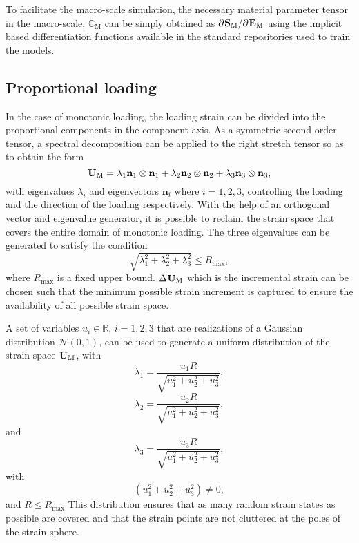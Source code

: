 To facilitate the macro-scale simulation, the necessary material parameter tensor in the macro-scale, $ \mathbb{C}_\text{M} $ can be simply obtained as $ \partial\tgm[]{S}/\partial\tgm[]{E} $ using the implicit based differentiation functions available in the standard repositories used to train the models.

\subsection{Proportional loading}\label{nn-gendata-prop}
In the case of monotonic loading, the loading strain can be divided into the proportional components in the component axis. As a symmetric second order tensor, a spectral decomposition can be applied to the right stretch tensor so as to obtain the form
\begin{equation}\label{eq-nn-gen2}
\tgm[]{U}=\lambda_1\textbf{n}_1\otimes\textbf{n}_1+\lambda_2\textbf{n}_2\otimes\textbf{n}_2+\lambda_3\textbf{n}_3\otimes\textbf{n}_3,
\end{equation}
with eigenvalues $ \lambda_i $ and eigenvectors $ \textbf{n}_i $ where $ i={1,2,3} $, controlling the loading and the direction of the loading respectively. With the help of an orthogonal vector and eigenvalue generator, it is possible to reclaim the strain space that covers the entire domain of monotonic loading. The three eigenvalues can be generated to satisfy the condition
\begin{equation}\label{eq-nn-gen3}
\sqrt{\lambda_1^2+\lambda_2^2+\lambda_3^2}\le R_\text{max},
\end{equation}
where $ R_\text{max} $ is a fixed upper bound. $ \Delta\tgm[]{U} $ which is the incremental strain can be chosen such that the minimum possible strain increment is captured to ensure the availability of all possible strain space.

A set of variables $ u_i\in\mathbb{R} $, $ i=1,2,3 $ that are realizations of a Gaussian distribution $ \mathcal{N}(0,1) $, can be used to generate a uniform distribution of the strain space $ \tgm[]{U} $\cite{NoteMethodGenerating}, with
\begin{equation}\label{eq-nn-gen7}
\lambda_1=\frac{u_1R}{\sqrt{u_1^2+u_2^2+u_3^2}},
\end{equation}
\begin{equation}\label{eq-nn-gen7-1}
\lambda_2=\frac{u_2R}{\sqrt{u_1^2+u_2^2+u_3^2}},
\end{equation}
and
\begin{equation}\label{eq-nn-gen7-2}
\lambda_3=\frac{u_3R}{\sqrt{u_1^2+u_2^2+u_3^2}},
\end{equation}
with
\begin{equation*}
\left(u_1^2+u_2^2+u_3^2\right)\ne0,
\end{equation*}
and $ R\le R_\text{max} $
This distribution ensures that as many random strain states as possible are covered and that the strain points are not cluttered at the poles of the strain sphere.

